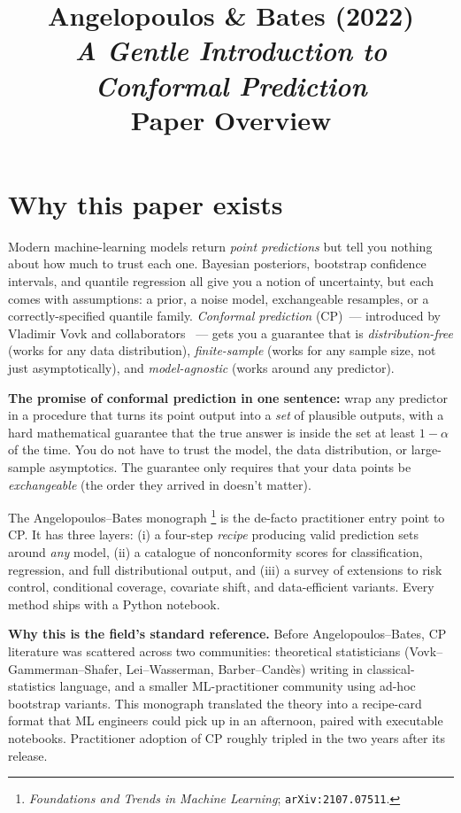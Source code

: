 \documentclass[letterpaper,11pt,leqno]{article}
\title{Angelopoulos \& Bates (2022)\\\textit{A Gentle Introduction to Conformal Prediction}\\[2pt]\large Paper Overview}
\author{}
\date{}
\begin{document}
\maketitle

\section{Why this paper exists}\label{s:intro}

Modern machine-learning models return \emph{point predictions} but tell you nothing about how much to trust each one. Bayesian posteriors, bootstrap confidence intervals, and quantile regression all give you a notion of uncertainty, but each comes with assumptions: a prior, a noise model, exchangeable resamples, or a correctly-specified quantile family. \emph{Conformal prediction} (CP)~--- introduced by Vladimir Vovk and collaborators \cite{vovk2005algorithmic}~--- gets you a guarantee that is \emph{distribution-free} (works for any data distribution), \emph{finite-sample} (works for any sample size, not just asymptotically), and \emph{model-agnostic} (works around any predictor).

\begin{keyinsight}
\textbf{The promise of conformal prediction in one sentence:} wrap any predictor in a procedure that turns its point output into a \emph{set} of plausible outputs, with a hard mathematical guarantee that the true answer is inside the set at least $1 - \alpha$ of the time. You do not have to trust the model, the data distribution, or large-sample asymptotics. The guarantee only requires that your data points be \emph{exchangeable} (the order they arrived in doesn't matter).
\end{keyinsight}

The Angelopoulos--Bates monograph \cite{angelopoulos2022gentle}\footnote{\textit{Foundations and Trends in Machine Learning}; \texttt{arXiv:2107.07511}.} is the de-facto practitioner entry point to CP. It has three layers: (i) a four-step \emph{recipe} producing valid prediction sets around \emph{any} model, (ii) a catalogue of nonconformity scores for classification, regression, and full distributional output, and (iii) a survey of extensions to risk control, conditional coverage, covariate shift, and data-efficient variants. Every method ships with a Python notebook.

\begin{explain}
\textbf{Why this is the field's standard reference.} Before Angelopoulos--Bates, CP literature was scattered across two communities: theoretical statisticians (Vovk--Gammerman--Shafer, Lei--Wasserman, Barber--Cand\`es) writing in classical-statistics language, and a smaller ML-practitioner community using ad-hoc bootstrap variants. This monograph translated the theory into a recipe-card format that ML engineers could pick up in an afternoon, paired with executable notebooks. Practitioner adoption of CP roughly tripled in the two years after its release.
\end{explain}
\end{document}
